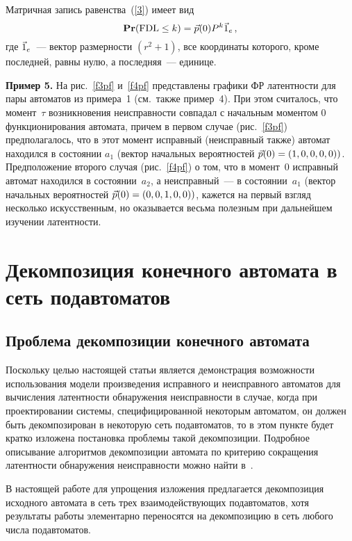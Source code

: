 \begin{multicols}{2}
 Матричная запись равенства~(\ref{3}) имеет вид
$$
{\bf Pr}(\mathrm{FDL} \le k) = \vec p(0) P^{k} \vec 1_e\,,
$$
где $\vec 1_e$~--- вектор размерности $(r^2 + 1)$, все координаты которого,
кроме последней, равны нулю, а последняя~--- единице.

\medskip
\noindent
{\bf Пример 5.} На рис.~\ref{f3pf} и~\ref{f4pf} представлены графики ФР латентности
для пары автоматов из примера~1 (см.\ также пример~4).
При этом считалось, что момент~$\tau$ возникновения неисправности совпадал
с начальным моментом 0 функционирования автомата, причем в первом случае
(рис.~\ref{f3pf}) предполагалось, что в этот момент исправный (неисправный также)
автомат находился в состоянии $a_1$ (вектор начальных вероятностей
$\vec p(0)=(1,0,0,0,0))$.
Предположение второго случая (рис.~\ref{f4pf}) о том, что в момент~0 исправный
автомат находился в со\-сто\-янии~$a_2$, а неисправный~--- в со\-сто\-янии~$a_1$
(вектор начальных вероятностей $\vec p(0)=(0,0,1,0,0))$,
кажется на первый взгляд несколько искусственным, но оказывается весьма
полезным при дальнейшем изучении латентности.


\vspace*{-6pt}
\section{Декомпозиция конечного автомата в сеть подавтоматов}

\vspace*{-3pt}

\subsection{Проблема декомпозиции конечного автомата}
\vspace*{-1pt}

Поскольку целью настоящей статьи является демонстрация возможности использования
модели произведения исправного и неисправного автоматов для вычисления
латентности обнаружения неисправности в случае, когда при проектировании
системы, специфицированной некоторым автоматом, он должен быть декомпозирован
в некоторую сеть подавтоматов, то в этом пункте будет кратко изложена постановка
проблемы такой декомпозиции.
Подробное описывание алгоритмов декомпозиции автомата по критерию сокращения
латентности обнаружения неисправности можно найти в~\cite{6}.

В настоящей работе для упрощения изложения предлагается декомпозиция исходного
автомата в сеть трех взаимодействующих подавтоматов, хотя результаты работы
элементарно переносятся на декомпозицию в сеть любого числа подавтоматов.


\end{multicols}
